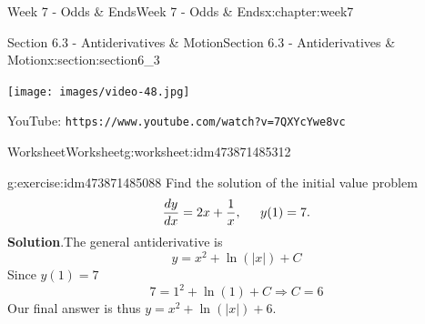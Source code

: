 \documentclass[oneside,10pt,]{book}
\newcommand{\blocktitlefont}{\relax}
\newcommand{\mono}[1]{\texttt{#1}}
\numberwithin{equation}{section}
\newlength{\qrsize}
\newlength{\previewwidth}
\begin{document}
\begin{chapterptx}{Week 7 - Odds \& Ends}{}{Week 7 - Odds \& Ends}{}{}{x:chapter:week7}
%
%
\typeout{************************************************}
\typeout{************************************************}
%
\begin{sectionptx}{Section 6.3 - Antiderivatives \& Motion}{}{Section 6.3 - Antiderivatives \& Motion}{}{}{x:section:section6_3}
\setlength{\qrsize}{9em}
\setlength{\previewwidth}{\linewidth}
\addtolength{\previewwidth}{-\qrsize}
\begin{tcbraster}[raster columns=2, raster column skip=1pt, raster halign=center, raster force size=false, raster left skip=0pt, raster right skip=0pt]%
\begin{tcolorbox}[previewstyle, width=\previewwidth]%
\texttt{[image: images/video-48.jpg]}%
\end{tcolorbox}%
\begin{tcolorbox}[qrstyle]%
{\hypersetup{urlcolor=black}}%
\end{tcolorbox}%
\begin{tcolorbox}[captionstyle]%
\small YouTube: \mono{https://www.youtube.com/watch?v=7QXYcYwe8vc}\end{tcolorbox}%
\end{tcbraster}%
%
%
\typeout{************************************************}
\typeout{************************************************}
%
\begin{worksheet-subsection}{Worksheet}{}{Worksheet}{}{}{g:worksheet:idm473871485312}
\begin{divisionexercise}{1}{}{}{g:exercise:idm473871485088}%
Find the solution of the initial value problem%
%
\begin{equation*}
\frac{dy}{dx} = 2x+\frac{1}{x}, \hspace{.2in} y(1) = 7 .
\end{equation*}
\textbf{\blocktitlefont Solution}.\hypertarget{g:solution:idm473871484960}{}\quad{}The general antiderivative is%
%
\begin{equation*}
y = x^2+\ln(|x|)+C 
\end{equation*}
Since \(y(1)=7\)%
%
\begin{equation*}
7 = 1^2+\ln(1)+C \Rightarrow C=6 
\end{equation*}
Our final answer is thus \(y = x^2+\ln(|x|)+6\).%

\end{divisionexercise}
\end{worksheet-subsection}
\end{sectionptx}
\end{chapterptx}
\end{document}
